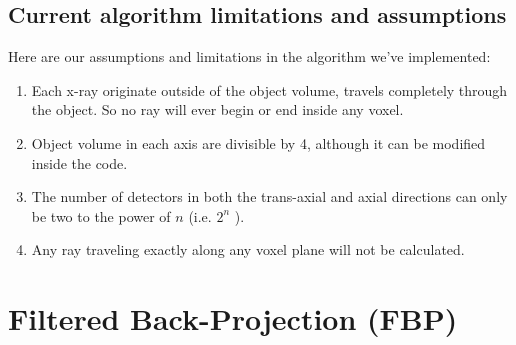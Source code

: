 \subsection{Current algorithm limitations and assumptions}
Here are our assumptions and limitations in the algorithm we've implemented:
\begin{enumerate}
\item Each x-ray originate outside of the object volume, travels completely through the object.  So no ray will ever begin or end inside any voxel.
\item Object volume in each axis are divisible by 4, although it can be modified inside the code.
\item The number of detectors in both the trans-axial and axial directions can only be two to the power of $n$ (i.e. $2^n$ ).
\item Any ray traveling exactly along any voxel plane will not be calculated.
\end{enumerate}




\section{Filtered Back-Projection (FBP) }


